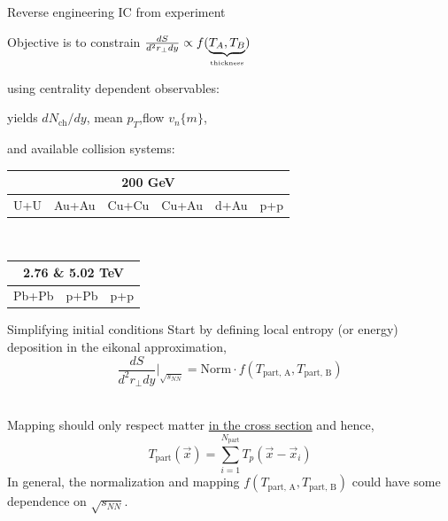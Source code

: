 \documentclass[xcolor=dvipsnames]{beamer}
\begin{document}
\usebackgroundtemplate{}

\begin{frame}{Reverse engineering IC from experiment}
    \vfill
    \begin{center}
    
    Objective is to constrain
    $\frac{dS}{d^2r_\perp dy} \propto f(\underbrace{T_A, T_B}_{\text{\tiny thickness}})$ \\ 
    
    \vspace{0.5 cm}

    using centrality dependent observables:\\
    
    \vspace{0.2 cm}
    
    yields $dN_\text{ch}/dy$, \quad mean $p_T$,\quad flow $v_n\{m\}$, \\
    
    \vspace{0.8 cm}
    
    and available collision systems:\\
 
    \vspace{0.3 cm}

    \small
    \begin{tabular}{cccccc}
        \multicolumn{6}{c}{200 GeV} \\ 
        \hline
        U+U & Au+Au & Cu+Cu & Cu+Au & d+Au & p+p
    \end{tabular} \\
    \vspace{0.4 cm}
    \begin{tabular}{ccc}
        \multicolumn{3}{c}{2.76 \& 5.02 TeV} \\
        \hline
        Pb+Pb & p+Pb & p+p
    \end{tabular}

    \end{center}
\end{frame}

\begin{frame}{Simplifying initial conditions}
    Start by defining local entropy (or energy) deposition in the eikonal approximation, 
    \begin{equation*}
        \frac{dS}{d^2r_\perp dy} \biggr \vert_{\sqrt{s_{NN}}} = \text{Norm} \cdot f(T_\text{part, A}, T_\text{part, B})
    \end{equation*}\\
    \vspace{0.1 cm}
    
    Mapping should only respect matter \underline{in the cross section} and hence,
    \begin{equation*}
        T_\text{part}(\vec{x}) = \sum\limits_{i=1}^{N_\text{part}} T_p(\vec{x} - \vec{x}_i)
    \end{equation*}
    In general, the normalization and mapping $f(T_\text{part, A}, T_\text{part, B})$ could have some dependence on $\sqrt{s_{NN}}$.
\end{frame}
\end{document}
